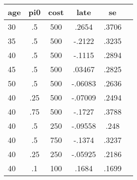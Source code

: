 \begin{table}[htbp]
\begin{tabular}{lccccc} \hline \hline
 \multicolumn{1}{c}{ age }  & pi0  & cost  & late  & se  \\  \hline 
       30 &        .5 &       500 &     .2654 &     .3706 \\  
       35 &        .5 &       500 &    -.2122 &     .3235 \\  
       40 &        .5 &       500 &    -.1115 &     .2894 \\  
       45 &        .5 &       500 &    .03467 &     .2825 \\  
       50 &        .5 &       500 &   -.06083 &     .2636 \\  
       40 &       .25 &       500 &   -.07009 &     .2494 \\  
       40 &       .75 &       500 &    -.1727 &     .3788 \\  
       40 &        .5 &       250 &   -.09558 &      .248 \\  
       40 &        .5 &       750 &    -.1374 &     .3237 \\  
       40 &       .25 &       250 &   -.05925 &     .2186 \\  
       40 &        .1 &       100 &     .1684 &     .1699 \\  
\hline \hline \end{tabular}
\end{table}
